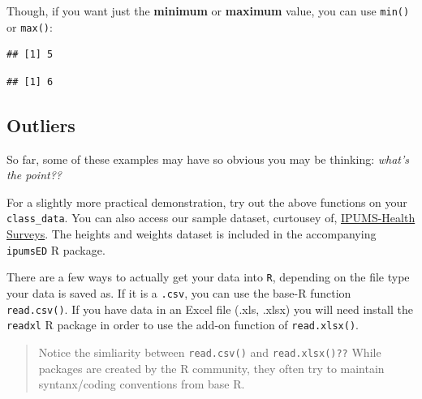 \documentclass[
]{book}
\newenvironment{Shaded}{\begin{snugshade}}{\end{snugshade}}
\newcommand{\FunctionTok}[1]{\textcolor[rgb]{0.13,0.29,0.53}{\textbf{#1}}}
\newcommand{\NormalTok}[1]{#1}
\newcommand{\SpecialCharTok}[1]{\textcolor[rgb]{0.81,0.36,0.00}{\textbf{#1}}}
\begin{document}
Though, if you want just the \textbf{minimum} or \textbf{maximum} value, you can use \texttt{min()} or \texttt{max()}:

\begin{Shaded}
\end{Shaded}

\begin{verbatim}
## [1] 5
\end{verbatim}

\begin{Shaded}
\end{Shaded}

\begin{verbatim}
## [1] 6
\end{verbatim}

\hypertarget{outliers}{%
\subsection{Outliers}\label{outliers}}

So far, some of these examples may have so obvious you may be thinking: \emph{what's the point??}

For a slightly more practical demonstration, try out the above functions on your \texttt{class\_data}. You can also access our sample dataset, curtousey of, \href{nhis.ipums.org}{IPUMS-Health Surveys}. The heights and weights dataset is included in the accompanying \texttt{ipumsED} R package.

There are a few ways to actually get your data into \texttt{R}, depending on the file type your data is saved as. If it is a \texttt{.csv}, you can use the base-R function \texttt{read.csv()}. If you have data in an Excel file (.xls, .xlsx) you will need install the \texttt{readxl} R package in order to use the add-on function of \texttt{read.xlsx()}.

\begin{quote}
Notice the simliarity between \texttt{read.csv()} and \texttt{read.xlsx()??}
While packages are created by the R community, they often try to maintain syntanx/coding conventions from base R.
\end{quote}
\end{document}

